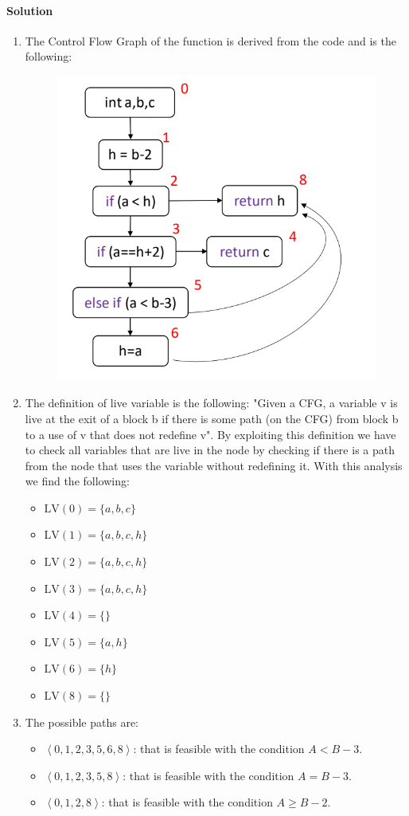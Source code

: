 \paragraph*{Solution}
\begin{enumerate}
    \item The Control Flow Graph of the function is derived from the code and is the following: 
        \begin{figure}[H]
            \centering
            \includegraphics[width=0.5\linewidth]{images/cfg.png}
        \end{figure}
    \item The definition of live variable is the following: "Given a CFG, a variable v is live at the exit of a block b if there is some path (on the CFG) from block b to a use of v that does not redefine v". 
        By exploiting this definition we have to check all variables that are live in the node by checking if there is a path from the node that uses the variable without redefining it. 
        With this analysis we find the following: 
        \begin{itemize}
            \item $\text{LV}(0) = \{a,b,c\}$
            \item $\text{LV}(1) = \{a,b,c,h\}$
            \item $\text{LV}(2) = \{a,b,c,h\}$
            \item $\text{LV}(3) = \{a,b,c,h\}$ 
            \item $\text{LV}(4) = \{ \}$ 
            \item $\text{LV}(5) = \{a,h\}$ 
            \item $\text{LV}(6) = \{h\}$ 
            \item $\text{LV}(8) = \{ \}$
        \end{itemize}
    \item The possible paths are: 
        \begin{itemize}
            \item $\left\langle 0,1,2,3,5,6,8 \right\rangle$: that is feasible with the condition $A < B-3$. 
            \item $\left\langle 0,1,2,3,5,8 \right\rangle$: that is feasible with the condition $A=B-3 $. 
            \item $\left\langle 0,1,2,8 \right\rangle$: that is feasible with the condition $A \geq B-2$. 
        \end{itemize}
\end{enumerate}